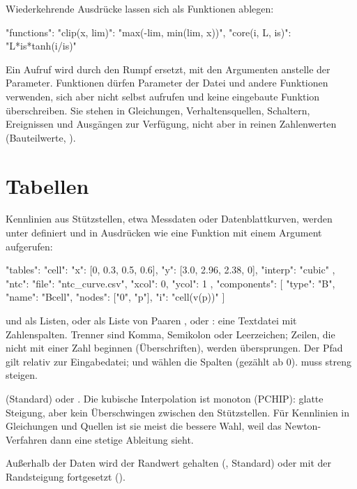 Wiederkehrende Ausdrücke lassen sich als Funktionen ablegen:

\begin{json}
"functions": {
  "clip(x, lim)":   "max(-lim, min(lim, x))",
  "core(i, L, is)": "L*is*tanh(i/is)"
}
\end{json}

Ein Aufruf wird durch den Rumpf ersetzt, mit den Argumenten anstelle der
Parameter. Funktionen dürfen Parameter der Datei und andere Funktionen
verwenden, sich aber nicht selbst aufrufen und keine eingebaute Funktion
überschreiben. Sie stehen in Gleichungen, Verhaltensquellen, Schaltern,
Ereignissen und Ausgängen zur Verfügung, nicht aber in reinen Zahlenwerten
(Bauteilwerte, ).

\section{Tabellen}
\label{sec:tabellen}

Kennlinien aus Stützstellen, etwa Messdaten oder Datenblattkurven, werden
unter  definiert und in Ausdrücken wie eine Funktion mit einem
Argument aufgerufen:

\begin{json}
"tables": {
  "cell": { "x": [0, 0.3, 0.5, 0.6], "y": [3.0, 2.96, 2.38, 0], "interp": "cubic" },
  "ntc":  { "file": "ntc_curve.csv", "xcol": 0, "ycol": 1 }
},
"components": [
  { "type": "B", "name": "Bcell", "nodes": ["0", "p"], "i": "cell(v(p))" }
]
\end{json}

\begin{description}[style=nextline,leftmargin=2em]
  \item[Daten]
     und  als Listen, oder  als Liste von
    Paaren \code{[x, y]}, oder : eine Textdatei mit
    Zahlenspalten. Trenner sind Komma, Semikolon oder Leerzeichen; Zeilen,
    die nicht mit einer Zahl beginnen (Überschriften), werden übersprungen.
    Der Pfad gilt relativ zur Eingabedatei;  und 
    wählen die Spalten (gezählt ab 0).  muss streng steigen.
  \item[{\code{interp}}]
     (Standard) oder . Die kubische
    Interpolation ist monoton (PCHIP): glatte Steigung, aber kein
    Überschwingen zwischen den Stützstellen. Für Kennlinien in Gleichungen
    und Quellen ist sie meist die bessere Wahl, weil das Newton-Verfahren
    dann eine stetige Ableitung sieht.
  \item[{\code{extrap}}]
    Außerhalb der Daten wird der Randwert gehalten (,
    Standard) oder mit der Randsteigung fortgesetzt ().
\end{description}

